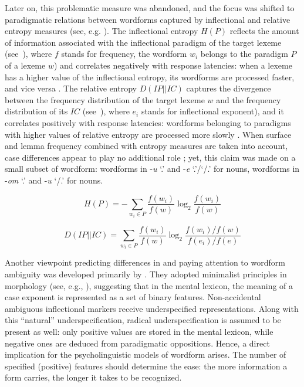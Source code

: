 \documentclass[output=paper, modfonts,newtxmath,hidelinks]{langscibook}
\begin{document}
Later on, this problematic measure was abandoned, and the focus was shifted to paradigmatic relations between wordforms captured by inflectional and relative entropy measures (see, e.g. \citealt{milin2009simultaneous}). The inflectional entropy $H(P)$ reflects the amount of information associated with the inflectional paradigm of the target lexeme (see~), where $f$ stands for frequency, the wordform $w_i$ belongs to the paradigm $P$ of a lexeme $w$) and correlates negatively with response latencies: when a lexeme has a higher value of the inflectional entropy, its wordforms are processed faster, and vice versa  \citep{del2004putting}. The relative entropy $D(IP||IC)$ captures the divergence between the frequency distribution of the target lexeme $w$ and the frequency distribution of its  $IC$ (see~), where $e_i$ stands for inflectional exponent), and it correlates positively with response latencies: wordforms belonging to paradigms with higher values of relative entropy are processed more slowly \citep{milin2009simultaneous}. When surface and lemma frequency combined with entropy measures are taken into account, case differences appear to play no additional role \citep{milin2009simultaneous}; yet, this claim was made on a small subset of wordform: wordforms in -\textit{u} `{\accc.\sg}’ and -\textit{e} ‘{\genn.\sg}’\slash ‘{\nomm/\accc.\pl}’ for  nouns, wordforms in -\textit{om} `{\ins.\sg}’ and -\textit{u} `{\datt/\locc.\sg}’ for  nouns.

	\ea\label{equation:inflEntropy}\begin{equation*}
		H(P) = -\sum_{w_i \in P} \frac{f(w_i)}{f(w)} \log _2\frac{f(w_i)}{f(w)}
        \end{equation*}
	\z

\ea\label{equation:relEntr}\begin{equation*}
		D(IP||IC) = \sum_{w_i \in P} \frac{f(w_i)}{f(w)} \log _2 \frac{f(w_i)/f(w)}{f(e_i)/f(e)}
        \end{equation*}
	\z

\noindent Another viewpoint predicting differences in   and paying attention to wordform ambiguity was developed primarily by \citet{clahsen2001mental}. They adopted minimalist principles in morphology (see, e.g., \citealt{wunderlich1996minimalist}), suggesting that in the mental lexicon, the meaning of a case exponent is represented as a set of binary features. Non-accidental ambiguous inflectional markers receive underspecified representations. Along with this ``natural'' underspecification, radical underspecification is assumed to be present as well: only positive values are stored in the mental lexicon, while negative ones are deduced from paradigmatic oppositions. Hence, a direct implication for the psycholinguistic models of wordform  arises. The number of specified (positive) features should determine the  ease: the more information a form carries, the longer it takes to be recognized.
\end{document}
